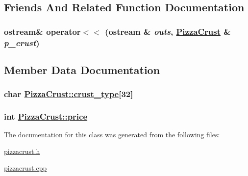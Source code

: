 \subsection{Friends And Related Function Documentation}
\hypertarget{class_pizza_crust_07175b634a5d3de09efbf91a6a782d36}{
\subsubsection[operator$<$$<$]{\setlength{\rightskip}{0pt plus 5cm}ostream\& operator$<$$<$ (ostream \& {\em outs}, \hyperlink{class_pizza_crust}{Pizza\-Crust} \& {\em p\_\-crust})}}
\label{class_pizza_crust_07175b634a5d3de09efbf91a6a782d36}




\subsection{Member Data Documentation}
\hypertarget{class_pizza_crust_91fd485033455873cfc268875c70012f}{
\subsubsection[crust\_\-type]{\setlength{\rightskip}{0pt plus 5cm}char \hyperlink{class_pizza_crust_91fd485033455873cfc268875c70012f}{Pizza\-Crust::crust\_\-type}\mbox{[}32\mbox{]}}}
\label{class_pizza_crust_91fd485033455873cfc268875c70012f}


\hypertarget{class_pizza_crust_78a5eb43deef9a7b5b9ce157b9d52ac4}{
\subsubsection[price]{\setlength{\rightskip}{0pt plus 5cm}int \hyperlink{class_pizza_crust_78a5eb43deef9a7b5b9ce157b9d52ac4}{Pizza\-Crust::price}}}
\label{class_pizza_crust_78a5eb43deef9a7b5b9ce157b9d52ac4}




The documentation for this class was generated from the following files:\begin{CompactItemize}
\item 
\hyperlink{pizzacrust_8h}{pizzacrust.h}\item 
\hyperlink{pizzacrust_8cpp}{pizzacrust.cpp}\end{CompactItemize}

